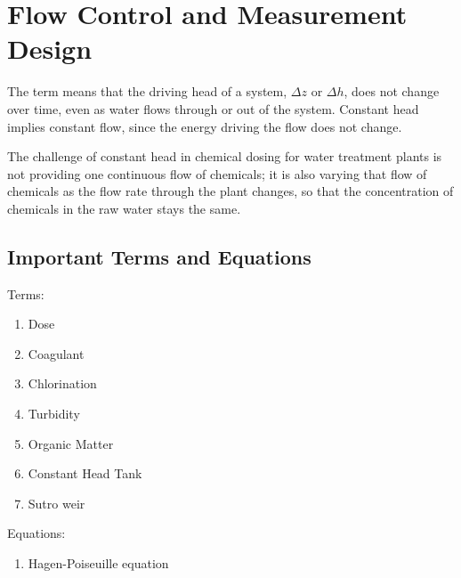 \documentclass[letterpaper,10pt,english]{sphinxmanual}
\begin{document}
\chapter{Flow Control and Measurement Design}
\label{\detokenize{Flow_Control_and_Measurement/FCM_Design:flow-control-and-measurement-design}}\label{\detokenize{Flow_Control_and_Measurement/FCM_Design:flow-control-design}}\label{\detokenize{Flow_Control_and_Measurement/FCM_Design::doc}}
The term  means that the driving head of a system, \(\Delta z\) or \(\Delta h\), does not change over time, even as water flows through or out of the system. Constant head implies constant flow, since the energy driving the flow does not change.

The challenge of constant head in chemical dosing for water treatment plants is not  providing one continuous flow of chemicals; it is also varying that flow of chemicals as the flow rate through the plant changes, so that the concentration of chemicals in the raw water stays the same.


\section{Important Terms and Equations}
\label{\detokenize{Flow_Control_and_Measurement/FCM_Design:important-terms-and-equations}}\label{\detokenize{Flow_Control_and_Measurement/FCM_Design:fcm-terms-eqs}}
Terms:
\begin{enumerate}
\item {} 
Dose

\item {} 
Coagulant

\item {} 
Chlorination

\item {} 
Turbidity

\item {} 
Organic Matter

\item {} 
Constant Head Tank

\item {} 
Sutro weir

\end{enumerate}

Equations:
\begin{enumerate}
\item {} 
Hagen-Poiseuille equation

\end{enumerate}
\end{document}
